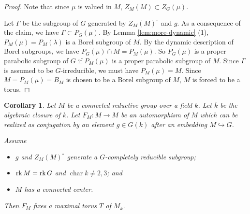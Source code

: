 \documentclass[10pt,a4paper,twoside]{article}
\newtheorem{cor}{Corollary}
\begin{document}
\begin{proof}
Note that since $\mu$ is valued in $M$, $Z_M(M) \subset Z_G(\mu)$.



Let $\Gamma$ be the subgroup of $G$ generated by
$Z_M(M)^\circ$ and $g$.
As a consequence of the claim, we have $\Gamma\subset P_G(\mu)$.
By Lemma \ref{lem:more-dynamic} (1), 
$P_M(\mu) = P_M(\lambda)$ is a Borel subgroup of $M$.
By the dynamic description of Borel subgroups, we have $P_G(\mu) \cap M = P_M(\mu)$.
So $P_G(\mu)$ is a proper parabolic subgroup of $G$
if $P_M(\mu)$ is a proper parabolic subgroup of $M$.
Since $\Gamma$ is assumed to be $G$-irreducible,
we must have $P_M(\mu) = M$.
Since $M=P_M(\mu)=B_M$ is chosen to be a Borel subgroup of $M$,
$M$ is forced to be a torus.
\end{proof}


\begin{cor}
\label{cor:sw-max-rank}
Let $M$ be a connected reductive group over a field $k$.
Let $\bar k$ be the algebraic closure of $k$.
Let $F_M : M\to M$ be an automorphism of $M$ which can be realized
as conjugation by an element $g\in G(k)$ after an embedding
$M \hookrightarrow G$.

Assume
\begin{itemize}
\item [(i)]
$g$ and $Z_M(M)^\circ$ generate a $G$-completely reducible subgroup;
\item [(ii)] $\operatorname{rk} M = \operatorname{rk} G$ and $\operatorname{char} k \ne 2,3$; and 
\item [(iii)] $M$ has a connected center.
\end{itemize}
Then $F_M$ fixes a maximal torus $T$ of $M_{\bar k}$.
\end{cor}
\end{document}
